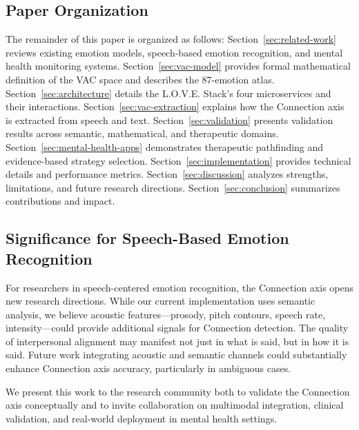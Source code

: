 \subsection{Paper Organization}

The remainder of this paper is organized as follows: Section~\ref{sec:related-work} reviews existing emotion models, speech-based emotion recognition, and mental health monitoring systems. Section~\ref{sec:vac-model} provides formal mathematical definition of the VAC space and describes the 87-emotion atlas. Section~\ref{sec:architecture} details the L.O.V.E. Stack's four microservices and their interactions. Section~\ref{sec:vac-extraction} explains how the Connection axis is extracted from speech and text. Section~\ref{sec:validation} presents validation results across semantic, mathematical, and therapeutic domains. Section~\ref{sec:mental-health-apps} demonstrates therapeutic pathfinding and evidence-based strategy selection. Section~\ref{sec:implementation} provides technical details and performance metrics. Section~\ref{sec:discussion} analyzes strengths, limitations, and future research directions. Section~\ref{sec:conclusion} summarizes contributions and impact.

\subsection{Significance for Speech-Based Emotion Recognition}

For researchers in speech-centered emotion recognition, the Connection axis opens new research directions. While our current implementation uses semantic analysis, we believe acoustic features—prosody, pitch contours, speech rate, intensity—could provide additional signals for Connection detection. The quality of interpersonal alignment may manifest not just in what is said, but in how it is said. Future work integrating acoustic and semantic channels could substantially enhance Connection axis accuracy, particularly in ambiguous cases.

We present this work to the research community both to validate the Connection axis conceptually and to invite collaboration on multimodal integration, clinical validation, and real-world deployment in mental health settings.
